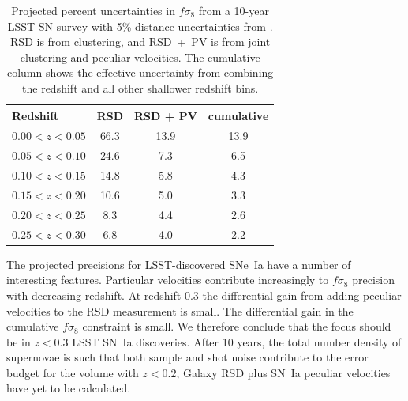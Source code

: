 \documentclass{aastex62}   	%
\begin{document}
\begin{table}
   \centering
   \begin{tabular}{@{} lccc @{}} %
	\hline
	Redshift & RSD & RSD + PV & cumulative\\ \hline
      $0.00<z<0.05$   & 66.3 & 13.9 & 13.9\\
     $0.05<z<0.10$            & 24.6     &  7.3 & 6.5\\
     $0.10<z<0.15$      & 14.8  & 5.8 & 4.3\\
     $0.15<z<0.20$      & 10.6  & 5.0 & 3.3\\
      $0.20<z<0.25$     & 8.3  & 4.4 & 2.6\\
     $0.25<z<0.30$  & 6.8  &  4.0 & 2.2\\
      \hline
   \end{tabular}
   \caption{Projected percent uncertainties in $f\sigma_8$ from a 10-year LSST SN survey with 5\% distance uncertainties from
   \citet{2017ApJ...847..128H}. RSD is from clustering, and RSD~+~PV is from joint clustering and peculiar velocities.
   The cumulative column shows the effective uncertainty from combining the redshift and all other shallower redshift bins.}
   \label{tab:howlett}
\end{table}

The projected precisions for LSST-discovered SNe~Ia have a number of interesting features.  Particular velocities contribute increasingly to
$f\sigma_8$ precision with decreasing redshift.  At redshift 0.3 the differential gain from adding peculiar velocities to the RSD measurement is small.
The differential gain in the cumulative $f\sigma_8$ constraint is small.  We therefore conclude that the focus should be in $z<0.3$ LSST SN~Ia discoveries.
After 10 years, the total number density of supernovae is such that both sample and shot noise contribute to the error budget for the volume with $z<0.2$, 
Galaxy RSD plus SN~Ia peculiar velocities have yet to be calculated.
\end{document}
